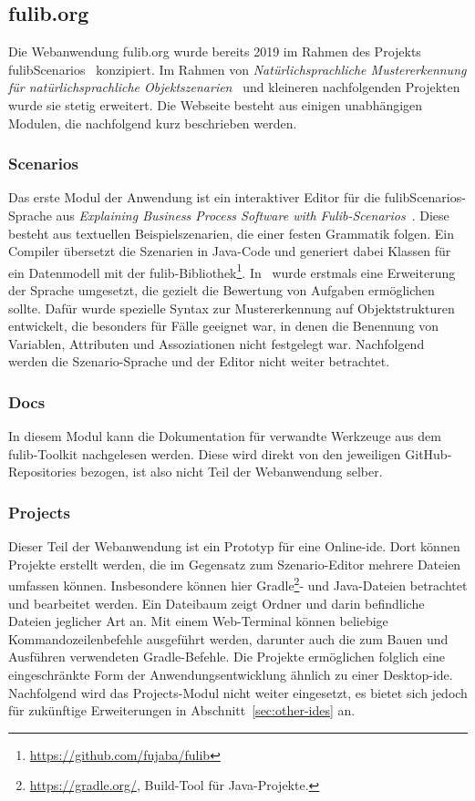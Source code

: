 \subsection{fulib.org}\label{subsec:fulib.org}

Die Webanwendung fulib.org wurde bereits 2019 im Rahmen des Projekts fulibScenarios~\cite{explain} konzipiert.
Im Rahmen von \textit{Natürlichsprachliche Mustererkennung für natürlichsprachliche Objektszenarien}~\cite{bachelor-thesis} und kleineren nachfolgenden Projekten wurde sie stetig erweitert.
Die Webseite besteht aus einigen unabhängigen Modulen, die nachfolgend kurz beschrieben werden.

\subsubsection{Scenarios}
Das erste Modul der Anwendung ist ein interaktiver Editor für die fulibScenarios-Sprache aus \textit{Explaining Business Process Software with Fulib-Scenarios}~\cite{explain}.
Diese besteht aus textuellen Beispielszenarien, die einer festen Grammatik folgen.
Ein Compiler übersetzt die Szenarien in Java-Code und generiert dabei Klassen für ein Datenmodell mit der fulib-Bibliothek\footnote{\url{https://github.com/fujaba/fulib}}.
In~\cite{bachelor-thesis} wurde erstmals eine Erweiterung der Sprache umgesetzt, die gezielt die Bewertung von Aufgaben ermöglichen sollte.
Dafür wurde spezielle Syntax zur Mustererkennung auf Objektstrukturen entwickelt, die besonders für Fälle geeignet war, in denen die Benennung von Variablen, Attributen und Assoziationen nicht festgelegt war.
Nachfolgend werden die Szenario-Sprache und der Editor nicht weiter betrachtet.

\subsubsection{Docs}
In diesem Modul kann die Dokumentation für verwandte Werkzeuge aus dem fulib-Toolkit nachgelesen werden.
Diese wird direkt von den jeweiligen GitHub-Repositories bezogen, ist also nicht Teil der Webanwendung selber.

\subsubsection{Projects}
Dieser Teil der Webanwendung ist ein Prototyp für eine Online-\ac{ide}.
Dort können Projekte erstellt werden, die im Gegensatz zum Szenario-Editor mehrere Dateien umfassen können.
Insbesondere können hier Gradle\footnote{
    \url{https://gradle.org/}, Build-Tool für Java-Projekte.
}- und Java-Dateien betrachtet und bearbeitet werden.
Ein Dateibaum zeigt Ordner und darin befindliche Dateien jeglicher Art an.
Mit einem Web-Terminal können beliebige Kommandozeilenbefehle ausgeführt werden, darunter auch die zum Bauen und Ausführen verwendeten Gradle-Befehle.
Die Projekte ermöglichen folglich eine eingeschränkte Form der Anwendungsentwicklung ähnlich zu einer Desktop-\ac{ide}.
Nachfolgend wird das Projects-Modul nicht weiter eingesetzt, es bietet sich jedoch für zukünftige Erweiterungen in Abschnitt~\ref{sec:other-ides} an.

